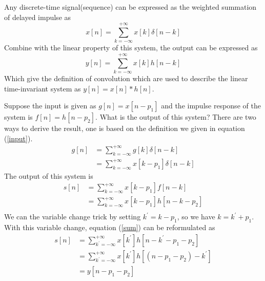 \documentclass[revised,endfloat]{geophysics}
\begin{document}
Any discrete-time signal(sequence) can be expressed as the weighted summation of delayed impulse as 
\begin{equation}
x[n] = \sum_{k=-\infty}^{+\infty} x[k] \delta[n-k]
\label{input}
\end{equation}
Combine with the linear property of this system, the output can be expressed as
\begin{equation}
y[n] = \sum_{k=-\infty}^{+\infty} x[k] h[n-k]
\end{equation}
Which give the definition of convolution which are used to describe the linear time-invariant system as $y[n] = x[n] \ast h[n]$.

Suppose the input is given as $g[n] = x[n-p_1]$ and the impulse response of the system is $f[n] = h[n-p_2]$. What is the output of this system? There are two ways to derive the result, one is based on the definition we given in equation (\ref{input}).
\begin{equation}
\begin{split}
g[n] &= \sum_{k=-\infty}^{+\infty} g[k] \delta[n-k] \\
       &= \sum_{k=-\infty}^{+\infty} x[k-p_1] \delta[n-k]
\end{split}
\end{equation}
The output of this system is
\begin{equation}
\begin{split}
s[n] &= \sum_{k=-\infty}^{+\infty} x[k-p_1] f[n-k] \\
       &= \sum_{k=-\infty}^{+\infty} x[k-p_1] h[n-k-p_2] \\
\end{split}
\label{sum}
\end{equation}
We can the variable change trick by setting $k^{\prime} = k-p_1$, so we have $k = k^{\prime} + p_1$. With this variable change, equation (\ref{sum}) can be reformulated as 
\begin{equation}
\begin{split}
s[n]  &= \sum_{k^{\prime}=-\infty}^{+\infty} x[k^{\prime}] h[n-k^{\prime}-p_1- p_2]    \\
        &= \sum_{k^{\prime}=-\infty}^{+\infty} x[k^{\prime}] h[(n-p_1- p_2)-k^{\prime}] \\
        &= y[n-p_1-p_2]
\end{split}
\label{sum}
\end{equation}




\end{document}
